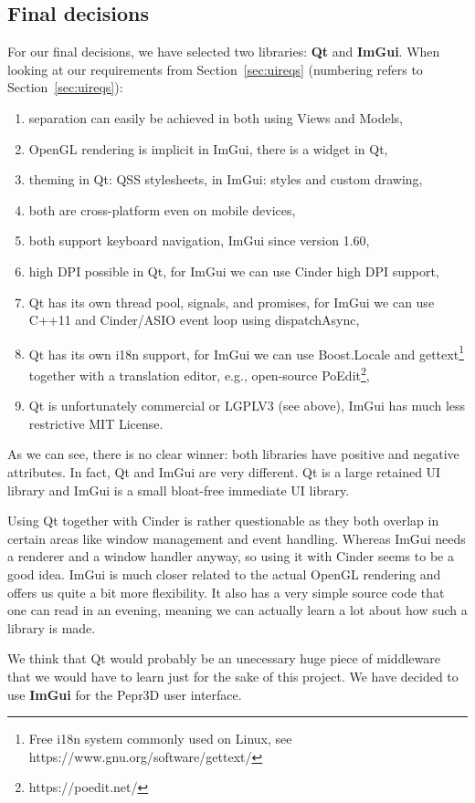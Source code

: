 \subsection{Final decisions}

For our final decisions, we have selected two libraries: \textbf{Qt} and \textbf{ImGui}.
When looking at our requirements from Section~\ref{sec:uireqs} (numbering refers to Section~\ref{sec:uireqs}):
%
\begin{enumerate}
\setlength\itemsep{0em}
\item separation can easily be achieved in both using Views and Models,
\item OpenGL rendering is implicit in ImGui, there is a widget in Qt,
\item theming in Qt: QSS stylesheets, in ImGui: styles and custom drawing,
\item both are cross-platform even on mobile devices,
\item both support keyboard navigation, ImGui since version 1.60,
\item high DPI possible in Qt, for ImGui we can use Cinder high DPI support,
\item Qt has its own thread pool, signals, and promises, for ImGui we can use C++11 and Cinder/ASIO event loop using dispatchAsync,
\item Qt has its own i18n support, for ImGui we can use Boost.Locale and gettext\footnote{Free i18n system commonly used on Linux, see https://www.gnu.org/software/gettext/} together with a translation editor, e.g., open-source PoEdit\footnote{https://poedit.net/},
\item Qt is unfortunately commercial or LGPLV3 (see above), ImGui has much less restrictive MIT License.
\end{enumerate}

As we can see, there is no clear winner: both libraries have positive and negative attributes.
In fact, Qt and ImGui are very different.
Qt is a large retained UI library and ImGui is a small bloat-free immediate UI library.

Using Qt together with Cinder is rather questionable as they both overlap in certain areas like window management and event handling.
Whereas ImGui needs a renderer and a window handler anyway, so using it with Cinder seems to be a good idea.
ImGui is much closer related to the actual OpenGL rendering and offers us quite a bit more flexibility.
It also has a very simple source code that one can read in an evening, meaning we can actually learn a lot about how such a library is made.

We think that Qt would probably be an unecessary huge piece of middleware that we would have to learn just for the sake of this project.
We have decided to use \textbf{ImGui} for the Pepr3D user interface.
